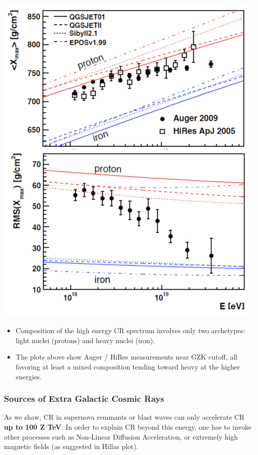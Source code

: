 \documentclass[
  letterpaper,
  DIV=11,
  numbers=noendperiod]{scrreprt}
\providecommand{\tightlist}{%
  \setlength{\itemsep}{0pt}\setlength{\parskip}{0pt}}\usepackage{longtable,booktabs,array}
\begin{document}
\includegraphics{images/AugerUHECRComp.png}

\begin{itemize}
\tightlist
\item
  Composition of the high energy CR spectrum involves only two
  archetypes: light nuclei (protons) and heavy nuclei (iron).
\item
  The plots above show Auger / HiRes measurements near GZK cutoff, all
  favoring at least a mixed composition tending toward heavy at the
  higher energies.
\end{itemize}

\subsubsection*{Sources of Extra Galactic Cosmic
Rays}\label{sources-of-extra-galactic-cosmic-rays}

As we shaw, CR in supernova remmants or blast waves can only accelerate
CR \textbf{up to 100 Z TeV}. In order to explain CR beyond this energy,
one has to invoke other processes such as Non-Linear Diffusion
Acceleration, or extremely high magnetic fields (as suggested in Hillas
plot).
\end{document}
